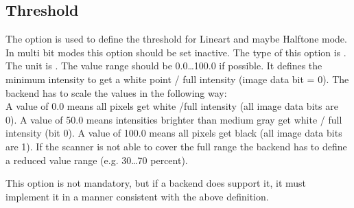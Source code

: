 \documentclass[11pt,DVIps]{report}
\begin{document}
\subsection{Threshold}
\begin{changebar}
The option  is used to define the threshold
for Lineart and maybe Halftone mode. In multi bit modes
this option should be set inactive.
The type of this option is .
The unit is . The value range
should be 0.0\ldots100.0 if possible.
It defines the minimum intensity to get a white point / full intensity
(image data bit = 0). The backend has to
scale the values in the following way:\\
A value of 0.0 means all pixels get white /full intensity (all image data
bits are 0).  A value of 50.0 means intensities brighter than medium gray
get white / full intensity (bit 0).  A value of 100.0 means all pixels get
black (all image data bits are 1). If the scanner is not able to
cover the full range the backend has to define a reduced
value range (e.g. 30\ldots70 percent).

This option is not mandatory, but if a backend does support it, it
must implement it in a manner consistent with the above definition.\\
\end{changebar}
\end{document}
